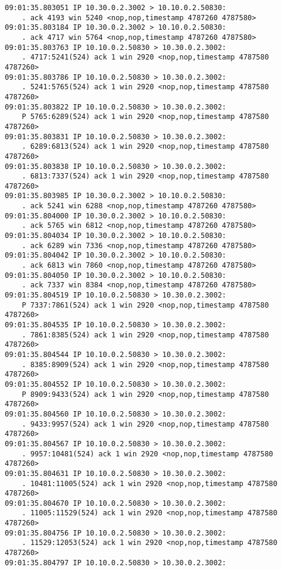\documentclass[a4paper,12pt]{article}
\begin{document}
\begin{Verbatim}
09:01:35.803051 IP 10.30.0.2.3002 > 10.10.0.2.50830: 
    . ack 4193 win 5240 <nop,nop,timestamp 4787260 4787580>
09:01:35.803184 IP 10.30.0.2.3002 > 10.10.0.2.50830: 
    . ack 4717 win 5764 <nop,nop,timestamp 4787260 4787580>
09:01:35.803763 IP 10.10.0.2.50830 > 10.30.0.2.3002: 
    . 4717:5241(524) ack 1 win 2920 <nop,nop,timestamp 4787580 4787260>
09:01:35.803786 IP 10.10.0.2.50830 > 10.30.0.2.3002: 
    . 5241:5765(524) ack 1 win 2920 <nop,nop,timestamp 4787580 4787260>
09:01:35.803822 IP 10.10.0.2.50830 > 10.30.0.2.3002: 
    P 5765:6289(524) ack 1 win 2920 <nop,nop,timestamp 4787580 4787260>
09:01:35.803831 IP 10.10.0.2.50830 > 10.30.0.2.3002: 
    . 6289:6813(524) ack 1 win 2920 <nop,nop,timestamp 4787580 4787260>
09:01:35.803838 IP 10.10.0.2.50830 > 10.30.0.2.3002: 
    . 6813:7337(524) ack 1 win 2920 <nop,nop,timestamp 4787580 4787260>
09:01:35.803985 IP 10.30.0.2.3002 > 10.10.0.2.50830: 
    . ack 5241 win 6288 <nop,nop,timestamp 4787260 4787580>
09:01:35.804000 IP 10.30.0.2.3002 > 10.10.0.2.50830: 
    . ack 5765 win 6812 <nop,nop,timestamp 4787260 4787580>
09:01:35.804034 IP 10.30.0.2.3002 > 10.10.0.2.50830: 
    . ack 6289 win 7336 <nop,nop,timestamp 4787260 4787580>
09:01:35.804042 IP 10.30.0.2.3002 > 10.10.0.2.50830: 
    . ack 6813 win 7860 <nop,nop,timestamp 4787260 4787580>
09:01:35.804050 IP 10.30.0.2.3002 > 10.10.0.2.50830: 
    . ack 7337 win 8384 <nop,nop,timestamp 4787260 4787580>
09:01:35.804519 IP 10.10.0.2.50830 > 10.30.0.2.3002: 
    P 7337:7861(524) ack 1 win 2920 <nop,nop,timestamp 4787580 4787260>
09:01:35.804535 IP 10.10.0.2.50830 > 10.30.0.2.3002: 
    . 7861:8385(524) ack 1 win 2920 <nop,nop,timestamp 4787580 4787260>
09:01:35.804544 IP 10.10.0.2.50830 > 10.30.0.2.3002: 
    . 8385:8909(524) ack 1 win 2920 <nop,nop,timestamp 4787580 4787260>
09:01:35.804552 IP 10.10.0.2.50830 > 10.30.0.2.3002: 
    P 8909:9433(524) ack 1 win 2920 <nop,nop,timestamp 4787580 4787260>
09:01:35.804560 IP 10.10.0.2.50830 > 10.30.0.2.3002: 
    . 9433:9957(524) ack 1 win 2920 <nop,nop,timestamp 4787580 4787260>
09:01:35.804567 IP 10.10.0.2.50830 > 10.30.0.2.3002: 
    . 9957:10481(524) ack 1 win 2920 <nop,nop,timestamp 4787580 4787260>
09:01:35.804631 IP 10.10.0.2.50830 > 10.30.0.2.3002: 
    . 10481:11005(524) ack 1 win 2920 <nop,nop,timestamp 4787580 4787260>
09:01:35.804670 IP 10.10.0.2.50830 > 10.30.0.2.3002: 
    . 11005:11529(524) ack 1 win 2920 <nop,nop,timestamp 4787580 4787260>
09:01:35.804756 IP 10.10.0.2.50830 > 10.30.0.2.3002: 
    . 11529:12053(524) ack 1 win 2920 <nop,nop,timestamp 4787580 4787260>
09:01:35.804797 IP 10.10.0.2.50830 > 10.30.0.2.3002: 

\end{Verbatim}
\end{document}
